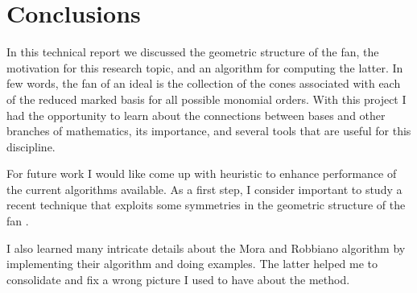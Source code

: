\section{Conclusions}

In this technical report we discussed the geometric structure
of the \grob fan, the motivation for this research topic, and
an algorithm for computing the latter. In few words, the \grob fan of an ideal is the
collection of the cones associated with each of the reduced
marked \grob basis for all possible monomial orders. With this
project I had the opportunity to learn about the connections between
\grob bases and other branches of mathematics, its importance, and several
tools that are useful for this discipline.

For future work I would like come up with heuristic to enhance performance
of the current algorithms available. As a first step, I consider important
to study a recent technique that exploits some symmetries in the
geometric structure of the \grob fan \cite{2007MaCom..76.2189F}.

I also learned many intricate details about the Mora and Robbiano algorithm
by implementing their algorithm and doing examples. The latter helped me
to consolidate and fix a wrong picture I used to have about the
method.

